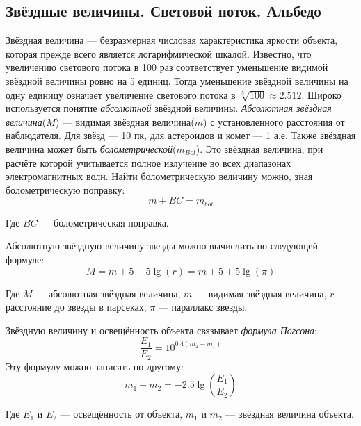\subsection{Звёздные величины. Световой поток. Альбедо}

Звёздная величина --- безразмерная числовая характеристика яркости объекта, которая прежде всего является логарифмической шкалой. Известно, что увеличению светового потока в 100 раз соответствует уменьшение видимой звёздной величины ровно на 5 единиц. Тогда уменьшение звёздной величины на одну единицу означает увеличение светового потока в $\sqrt[5]{100}\approx 2.512$. Широко используется понятие \textit{абсолютной} звёздной величины. \textit{Абсолютная звёздная величина}($M$) --- видимая звёздная величина($m$) с установленного расстояния от наблюдателя. Для звёзд --- 10 пк, для астероидов и комет  --- 1 а.е. Также звёздная величина может быть \textit{болометрической}($m_{Bol}$). Это звёздная величина, при расчёте которой учитывается полное излучение во всех диапазонах электромагнитных волн. Найти болометрическую величину можно, зная болометрическую поправку:
\begin{equation}
m+BC=m_{bol}
\end{equation}

Где $BC$ --- болометрическая поправка.

Абсолютную звёздную величину звезды можно вычислить по следующей формуле:
\begin{equation}
M=m+5-5\lg(r)=m+5+5\lg(\pi)
\end{equation}

Где $M$ --- абсолютная звёздная величина, $m$ --- видимая звёздная величина, $r$ --- расстояние до звезды в парсеках, $\pi$ --- параллакс звезды.


Звёздную величину и освещённость объекта связывает \textit{формула Погсона}:
\begin{equation}
\frac{E_1}{E_2}=10^{0.4(m_2-m_1)}
\end{equation}
Эту формулу можно записать по-другому:
\begin{equation}
m_1-m_2=-2.5\lg\left(\frac{E_1}{E_2}\right)
\end{equation}

Где $E_1$ и $E_2$ --- освещённость от объекта, $m_1$ и $m_2$ --- звёздная величина объекта.
